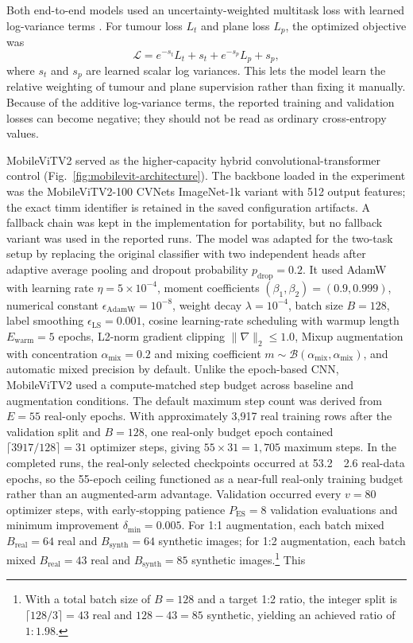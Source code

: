 \documentclass[conference,twoside]{IEEEtran}
\begin{document}
Both end-to-end models used an uncertainty-weighted multitask loss with learned log-variance terms \cite{kendall2018multitask}. For tumour loss $L_t$ and plane loss $L_p$, the optimized objective was
\begin{equation}
  \mathcal{L} = e^{-s_t}L_t + s_t + e^{-s_p}L_p + s_p,
\end{equation}
where $s_t$ and $s_p$ are learned scalar log variances. This lets the model learn the relative weighting of tumour and plane supervision rather than fixing it manually. Because of the additive log-variance terms, the reported training and validation losses can become negative; they should not be read as ordinary cross-entropy values.

MobileViTV2 served as the higher-capacity hybrid convolutional-transformer control \cite{mehta2022mobilevitv2} (Fig.~\ref{fig:mobilevit-architecture}). The backbone loaded in the experiment was the MobileViTV2-100 CVNets ImageNet-1k variant with 512 output features; the exact timm identifier is retained in the saved configuration artifacts. A fallback chain was kept in the implementation for portability, but no fallback variant was used in the reported runs. The model was adapted for the two-task setup by replacing the original classifier with two independent heads after adaptive average pooling and dropout probability $p_{\mathrm{drop}}=0.2$. It used AdamW \cite{loshchilov2019adamw} with learning rate $\eta = 5\times10^{-4}$, moment coefficients $(\beta_1,\beta_2)=(0.9,0.999)$, numerical constant $\epsilon_{\mathrm{AdamW}}=10^{-8}$, weight decay $\lambda = 10^{-4}$, batch size $B=128$, label smoothing $\epsilon_{\mathrm{LS}}=0.001$, cosine learning-rate scheduling \cite{loshchilov2017sgdr} with warmup length $E_{\mathrm{warm}}=5$ epochs, L2-norm gradient clipping $\|\nabla\|_2 \leq 1.0$, Mixup augmentation \cite{zhang2018mixup} with concentration $\alpha_{\mathrm{mix}}=0.2$ and mixing coefficient $m\sim\mathcal{B}(\alpha_{\mathrm{mix}},\alpha_{\mathrm{mix}})$, and automatic mixed precision by default. Unlike the epoch-based CNN, MobileViTV2 used a compute-matched step budget across baseline and augmentation conditions. The default maximum step count was derived from $E=55$ real-only epochs. With approximately 3,917 real training rows after the validation split and $B=128$, one real-only budget epoch contained $\lceil 3917/128\rceil=31$ optimizer steps, giving $55\times31=1{,}705$ maximum steps. In the completed runs, the real-only selected checkpoints occurred at 53.2~\textpm{}~2.6 real-data epochs, so the 55-epoch ceiling functioned as a near-full real-only training budget rather than an augmented-arm advantage. Validation occurred every $v=80$ optimizer steps, with early-stopping patience $P_{\mathrm{ES}}=8$ validation evaluations and minimum improvement $\delta_{\min}=0.005$. For 1:1 augmentation, each batch mixed $B_{\mathrm{real}}=64$ real and $B_{\mathrm{synth}}=64$ synthetic images; for 1:2 augmentation, each batch mixed $B_{\mathrm{real}}=43$ real and $B_{\mathrm{synth}}=85$ synthetic images.\footnote{With a total batch size of $B=128$ and a target 1:2 ratio, the integer split is $\lceil 128/3 \rceil = 43$ real and $128-43=85$ synthetic, yielding an achieved ratio of $1{:}1.98$.} This 
\end{document}
